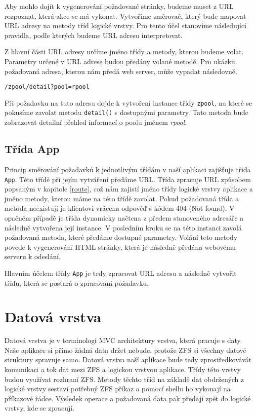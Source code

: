 Aby mohlo dojít k vygenerování požadované stránky, budeme muset z URL rozpoznat, která akce se má vykonat. Vytvoříme směrovač, který bude mapovat URL adresy na metody tříd logické vrstvy. Pro tento účel stanovíme následující pravidla, podle kterých budeme URL adresu interpretovat.

Z hlavní části URL adresy určíme jméno třídy a metody, kterou budeme volat. Parametry určené v URL adrese budou předány volané metodě. Pro ukázku požadovaná adresa, kterou nám předá web server, může vypadat následovně.
\begin{verbatim}
/zpool/detail?pool=rpool
\end{verbatim}
Při požadavku na tuto adresu dojde k vytvoření instance třídy \verb|zpool|, na které se pokusíme zavolat metodu \verb|detail()| s dostupnými parametry. Tato metoda bude zobrazovat detailní přehled informací o poolu jménem \emph{rpool}.
    \subsection{Třída App}
    Princip směrování požadavků k jednotlivým třídám v naší aplikaci zajišťuje třída \verb|App|. Této třídě při jejím vytváření předáme URL. Třída zpracuje URL způsobem popsaným v kapitole \ref{route}, což nám zajistí jméno třídy logické vrstvy aplikace a jméno metody, kterou máme na této třídě zavolat. Pokud požadovaná třída a metoda neexistují je klientovi vrácena odpověď s kódem 404 (Not found). V opačném případě je třída dynamicky načtena z předem stanoveného adresáře a následně vytvořena její instance. V posledním kroku se na této instanci zavolá požadovaná metoda, které předáme dostupné parametry. Volání teto metody povede k vygenerování HTML stránky, která je následně předána webovému serveru k odeslání.

    Hlavním účelem třídy \verb|App| je tedy zpracovat URL adresu a následně vytvořit třídu, která se postará o zpracování požadavku.

\section{Datová vrstva}
Datová vrstva je v terminologi MVC architektury vrstva, která pracuje s daty. Naše aplikace si přímo žádná data držet nebude, protože ZFS si všechny datové struktury spravuje samo. Datová vrstva naší aplikace bude tedy zprostředkovávát komunikaci a tok dat mezi ZFS a logickou vrstvou aplikace. Třídy této vrstvy budou využívat rozhraní ZFS. Metody těchto tříd na základě dat obdržených z logické vrstvy sestaví potřebný ZFS příkaz a pomocí shellu ho vykonají na příkazové řádce. Výsledek operace a požadovaná data pak předají zpět do logické vrstvy, kde se zpracují.

